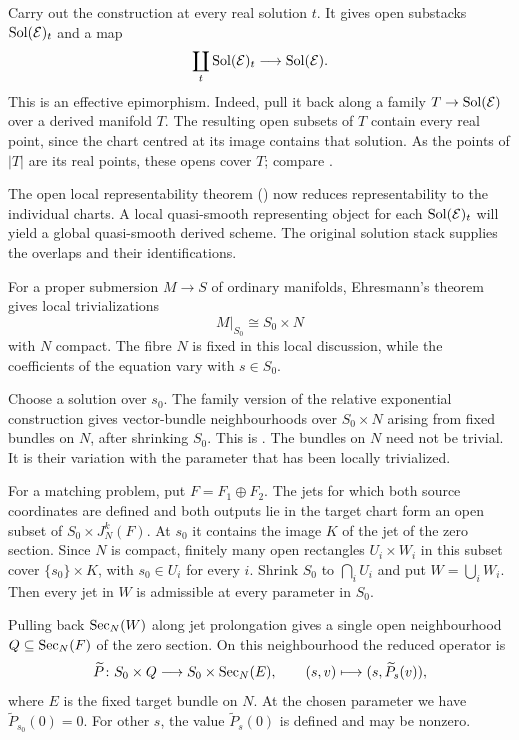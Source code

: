 Carry out the construction at every real solution $t$.
It gives open substacks $\operatorname{Sol}(\mathcal E)_t$ and a map
\[
 \coprod_t\operatorname{Sol}(\mathcal E)_t\longrightarrow\operatorname{Sol}(\mathcal E).
\]
This is an effective epimorphism. Indeed, pull it back along a family
$T\to\operatorname{Sol}(\mathcal E)$ over a derived manifold $T$. The resulting open
subsets of $T$ contain every real point, since the chart centred at its
image contains that solution. As the points of $|T|$ are its real
points, these opens cover $T$; compare
\cite[Remark~2.1.46]{Steffens_Representability_Elliptic_Moduli}.

The open local representability theorem () now reduces
representability to the individual charts.
A local quasi-smooth representing object for each
$\operatorname{Sol}(\mathcal E)_t$ will yield a global quasi-smooth derived scheme.
The original solution stack supplies the overlaps and their identifications.

For a proper submersion $M\to S$ of ordinary manifolds, Ehresmann's
theorem gives local trivializations
\[
 M|_{S_0}\cong S_0\times N
\]
with $N$ compact. The fibre $N$ is fixed in this local discussion,
while the coefficients of the equation vary with $s\in S_0$.

Choose a solution over $s_0$. The family version of the relative
exponential construction gives vector-bundle neighbourhoods over
$S_0\times N$ arising from fixed bundles on $N$, after shrinking
$S_0$. This is
\cite[Lemma~3.2.20]{Steffens_Representability_Elliptic_Moduli}.
The bundles on $N$ need not be trivial. It is their variation with
the parameter that has been locally trivialized.

For a matching problem, put $F=F_1\oplus F_2$. The jets for which both
source coordinates are defined and both outputs lie in the target
chart form an open subset of $S_0\times J_N^k(F)$. At $s_0$ it
contains the image $K$ of the jet of the zero section. Since $N$ is
compact, finitely many open rectangles $U_i\times W_i$ in this subset
cover $\{s_0\}\times K$, with $s_0\in U_i$ for every $i$. Shrink
$S_0$ to $\bigcap_i U_i$ and put $W=\bigcup_i W_i$. Then every jet
in $W$ is admissible at every parameter in $S_0$.

Pulling back $\operatorname{Sec}_N(W)$ along jet prolongation gives a single open
neighbourhood $Q\subseteq\operatorname{Sec}_N(F)$ of the zero section. On this
neighbourhood the reduced operator is
\[
 \widetilde P\colon S_0\times Q
 \longrightarrow S_0\times\operatorname{Sec}_N(E),
 \qquad(s,v)\longmapsto(s,\widetilde P_s(v)),
\]
where $E$ is the fixed target bundle on $N$. At the chosen parameter
we have $\widetilde P_{s_0}(0)=0$. For other $s$, the value
$\widetilde P_s(0)$ is defined and may be nonzero.


